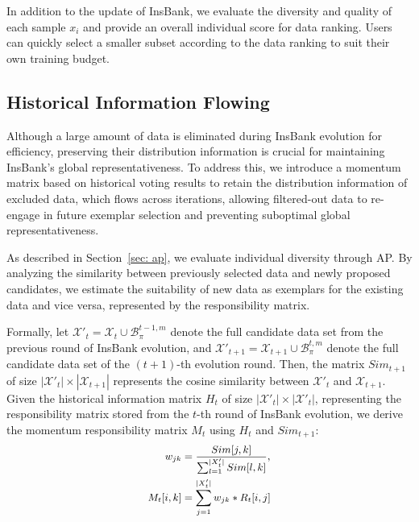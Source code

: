 In addition to the update of InsBank, we evaluate the diversity and quality of each sample $x_i$ and provide an overall individual score for data ranking. Users can quickly select a smaller subset according to the data ranking to suit their own training budget.

\subsection{Historical Information Flowing}


Although a large amount of data is eliminated during InsBank evolution for efficiency, preserving their distribution information is crucial for maintaining InsBank's global representativeness. To address this, we introduce a momentum matrix based on historical voting results to retain the distribution information of excluded data, which flows across iterations, allowing filtered-out data to re-engage in future exemplar selection and preventing suboptimal global representativeness.


As described in Section~\ref{sec: ap}, we evaluate individual diversity through AP. By analyzing the similarity between previously selected data and newly proposed candidates, we estimate the suitability of new data as exemplars for the existing data and vice versa, represented by the responsibility matrix. 


Formally, let $\mathcal{X}'_t = \mathcal{X}_t \cup \mathcal{B}^{t-1, m}_\pi$ denote the full candidate data set from the previous round of InsBank evolution, and $\mathcal{X}'_{t+1} = \mathcal{X}_{t+1} \cup \mathcal{B}^{t, m}_\pi$ denote the full candidate data set of the $(t+1)$-th evolution round.
Then, the matrix $Sim_{t+1}$ of size \( |\mathcal{X}'_t| \times |\mathcal{X}_{t+1}| \) represents the cosine similarity between $\mathcal{X}'_t$ and $\mathcal{X}_{t+1}$.
Given the historical information matrix \(H_t\) of size \(|\mathcal{X}'_t| \times |\mathcal{X}'_t|\), representing the responsibility matrix stored from the \(t\)-th round of InsBank evolution, we derive the momentum responsibility matrix \(M_t\) using \(H_t\) and \(Sim_{t+1}\):
\begin{equation}
\label{eq: estimate top-right}
\small
\begin{aligned}
        w_{jk} &= \frac{Sim[j,k]}{\sum_{l=1}^{|X'_{t}|} Sim[l,k]}, \\
        M_t[i,k] &= \sum_{j=1}^{|X'_{t}|} w_{jk} * R_t[i,j]     
\end{aligned} 
\end{equation}


